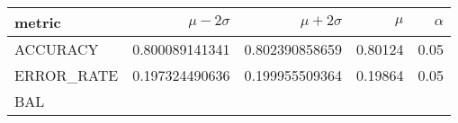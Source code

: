 \documentclass[11pt]{report}
\begin{document}
\begin{table}
    \centering
    \begin{tabular}{lrrrr}
    \hline
    
        \textbf{ metric }
        
           &
        
    
        \textbf{ $\mu - 2\sigma$ }
        
           &
        
    
        \textbf{ $\mu + 2\sigma$ }
        
           &
        
    
        \textbf{ $\mu$ }
        
           &
        
    
        \textbf{ $\alpha$ }
        
     
    \\
    \hline
    
        
            ACCURACY
             
               &
            
        
            0.800089141341
             
               &
            
        
            0.802390858659
             
               &
            
        
            0.80124
             
               &
            
        
            0.05
            
        
        \\
    
        
            ERROR\_RATE
             
               &
            
        
            0.197324490636
             
               &
            
        
            0.199955509364
             
               &
            
        
            0.19864
             
               &
            
        
            0.05
            
        
        \\
    
        
            BAL
             

\end{tabular}
\end{table}
\end{document}
